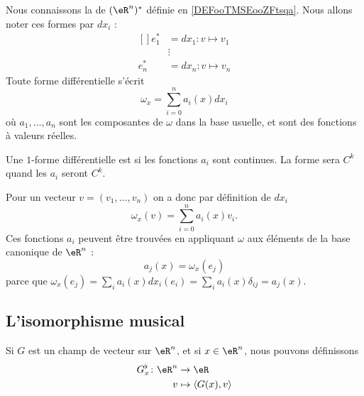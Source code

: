 Nous connaissons la de $(\eR^n)^*$ définie en \ref{DEFooTMSEooZFtsqa}. Nous allons noter ces formes par $dx_i$ :
\begin{equation}        \label{EQooITHKooDzigPY}
	\begin{aligned}[]
		e^*_1&=dx_1\colon v\mapsto v_1	\\
			&\vdots			\\
		e^*_n&=dx_n\colon v\mapsto v_n
	\end{aligned}
\end{equation}
Toute forme différentielle s'écrit
\begin{equation}
  \omega_x = \sum_{i=0}^n a_i(x) d x_i
\end{equation}
où $a_1,\ldots,a_n$ sont les composantes de $\omega$ dans la base usuelle, et sont des fonctions à valeurs réelles.

\begin{lemma}
    Une $1$-forme différentielle est  si les fonctions $a_i$ sont continues. La forme sera $C^k$ quand les $a_i$ seront $C^k$.
\end{lemma}

Pour un vecteur $v = (v_1,\ldots,v_n)$ on a donc par définition de $d x_i$
\begin{equation}
  \omega_x (v) = \sum_{i=0}^n a_i(x) v_i.
\end{equation}
Ces fonctions $a_i$ peuvent être trouvées en appliquant $\omega$ aux éléments de la base canonique de $\eR^n$ :
\begin{equation}
	a_j(x)=\omega_x(e_j)
\end{equation}
parce que $\omega_x(e_j)=\sum_ia_i(x)dx_i(e_i)=\sum_ia_i(x)\delta_{ij}=a_j(x)$.

\subsection{L'isomorphisme musical}

Si $G$ est un champ de vecteur sur $\eR^n$, et si $x\in\eR^n$, nous pouvons définissons
\begin{equation}		\label{EqDefBemol}
	\begin{aligned}[]
		G^{\flat}_x\colon \eR^n&\to \eR \\
			v&\mapsto \langle G(x), v\rangle
	\end{aligned}
\end{equation}

